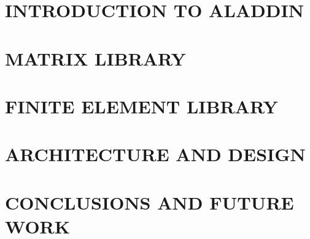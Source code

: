 \tableofcontents

\part{\bf INTRODUCTION TO ALADDIN}



\part{\bf MATRIX LIBRARY}





\part{\bf FINITE ELEMENT LIBRARY}




\part{\bf ARCHITECTURE AND DESIGN}




\part{\bf CONCLUSIONS AND FUTURE WORK}



 
     


